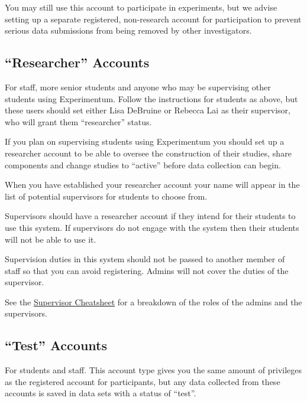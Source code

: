 \documentclass[]{book}
\begin{document}
You may still use this account to participate in experiments, but we
advise setting up a separate registered, non-research account for
participation to prevent serious data submissions from being removed by
other investigators.

\subsection{\texorpdfstring{``Researcher''
Accounts}{Researcher Accounts}}\label{researcher-accounts}

For staff, more senior students and anyone who may be supervising other
students using Experimentum. Follow the instructions for students as
above, but these users should set either Lisa DeBruine or Rebecca Lai as
their supervisor, who will grant them ``researcher'' status.

If you plan on supervising students using Experimentum you should set up
a researcher account to be able to oversee the construction of their
studies, share components and change studies to ``active'' before data
collection can begin.

When you have established your researcher account your name will appear
in the list of potential supervisors for students to choose from.

\begin{warning}
Supervisors should have a researcher account if they intend for their
students to use this system. If supervisors do not engage with the
system then their students will not be able to use it.

Supervision duties in this system should not be passed to another member
of staff so that you can avoid registering. Admins will not cover the
duties of the supervisor.

See the \protect\hyperlink{roles}{Supervisor Cheatsheet} for a breakdown
of the roles of the admins and the supervisors.
\end{warning}

\subsection{\texorpdfstring{``Test''
Accounts}{Test Accounts}}\label{test-accounts}

For students and staff. This account type gives you the same amount of
privileges as the registered account for participants, but any data
collected from these accounts is saved in data sets with a status of
``test''.
\end{document}
